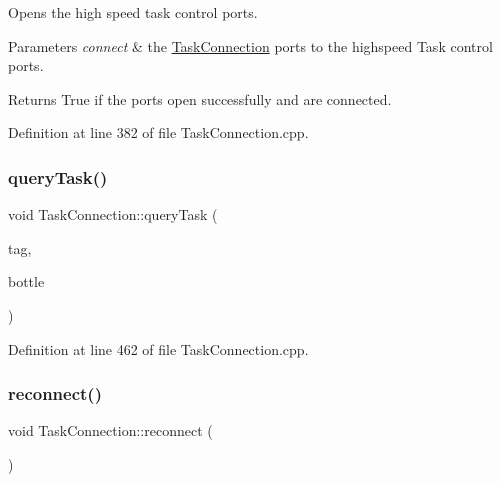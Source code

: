 Opens the high speed task control ports.


\begin{DoxyParams}{Parameters}
{\em connect} & the \hyperlink{classocra__recipes_1_1TaskConnection}{Task\+Connection} ports to the highspeed Task control ports. \\
\hline
\end{DoxyParams}
\begin{DoxyReturn}{Returns}
True if the ports open successfully and are connected. 
\end{DoxyReturn}


Definition at line 382 of file Task\+Connection.\+cpp.

\hypertarget{classocra__recipes_1_1TaskConnection_ae4450b3d9912471527716d7fe11e279e}{}\label{classocra__recipes_1_1TaskConnection_ae4450b3d9912471527716d7fe11e279e} 
\subsubsection{\texorpdfstring{query\+Task()}{queryTask()}}
{\footnotesize\ttfamily void Task\+Connection\+::query\+Task (\begin{DoxyParamCaption}\item[{\hyperlink{namespaceocra_ae51761f3980546f5ee4cbc6ebe4216dd}{ocra\+::\+T\+A\+S\+K\+\_\+\+M\+E\+S\+S\+A\+GE}}]{tag,  }\item[{yarp\+::os\+::\+Bottle \&}]{bottle }\end{DoxyParamCaption})}



Definition at line 462 of file Task\+Connection.\+cpp.

\hypertarget{classocra__recipes_1_1TaskConnection_a416154f1cd736647003442d905b9862e}{}\label{classocra__recipes_1_1TaskConnection_a416154f1cd736647003442d905b9862e} 
\subsubsection{\texorpdfstring{reconnect()}{reconnect()}}
{\footnotesize\ttfamily void Task\+Connection\+::reconnect (\begin{DoxyParamCaption}{ }\end{DoxyParamCaption})}




